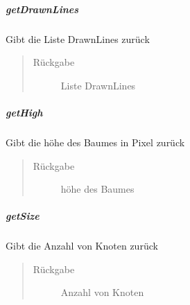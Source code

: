 \documentclass[letterpaper,10pt,ngerman]{sphinxmanual}
\begin{document}
\subparagraph{getDrawnLines}
\label{\detokenize{com/linuxluigi/edu/list/BinaryLinkedList:getdrawnlines}}

\begin{fulllineitems}
\label{\detokenize{com/linuxluigi/edu/list/BinaryLinkedList:com.linuxluigi.edu.list.BinaryLinkedList.getDrawnLines()}}
Gibt die Liste DrawnLines zurück
\begin{quote}\begin{description}
\item[{Rückgabe}] \leavevmode
Liste DrawnLines

\end{description}\end{quote}

\end{fulllineitems}



\subparagraph{getHigh}
\label{\detokenize{com/linuxluigi/edu/list/BinaryLinkedList:gethigh}}

\begin{fulllineitems}
\label{\detokenize{com/linuxluigi/edu/list/BinaryLinkedList:com.linuxluigi.edu.list.BinaryLinkedList.getHigh()}}
Gibt die höhe des Baumes in Pixel zurück
\begin{quote}\begin{description}
\item[{Rückgabe}] \leavevmode
höhe des Baumes

\end{description}\end{quote}

\end{fulllineitems}



\subparagraph{getSize}
\label{\detokenize{com/linuxluigi/edu/list/BinaryLinkedList:getsize}}

\begin{fulllineitems}
\label{\detokenize{com/linuxluigi/edu/list/BinaryLinkedList:com.linuxluigi.edu.list.BinaryLinkedList.getSize()}}
Gibt die Anzahl von Knoten zurück
\begin{quote}\begin{description}
\item[{Rückgabe}] \leavevmode
Anzahl von Knoten

\end{description}\end{quote}

\end{fulllineitems}
\end{document}
